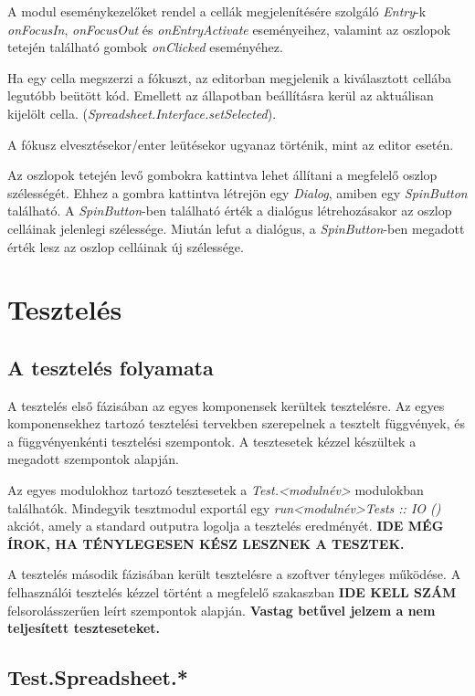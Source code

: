 A modul eseménykezelőket rendel a cellák megjelenítésére szolgáló \textit{Entry}-k \textit{onFocusIn}, \textit{onFocusOut} és \textit{onEntryActivate} eseményeihez, valamint az oszlopok tetején található gombok \textit{onClicked} eseményéhez.

Ha egy cella megszerzi a fókuszt, az editorban megjelenik a kiválasztott cellába legutóbb beütött kód. Emellett az állapotban beállításra kerül az aktuálisan kijelölt cella. (\textit{Spreadsheet.Interface.setSelected}).

A fókusz elvesztésekor/enter leütésekor ugyanaz történik, mint az editor esetén.

Az oszlopok tetején levő gombokra kattintva lehet állítani a megfelelő oszlop szélességét. Ehhez a gombra kattintva létrejön egy \textit{Dialog}, amiben egy \textit{SpinButton} található. A \textit{SpinButton}-ben található érték a dialógus létrehozásakor az oszlop celláinak jelenlegi szélessége. Miután lefut a dialógus, a \textit{SpinButton}-ben megadott érték lesz az oszlop celláinak új szélessége.

\section{Tesztelés}

\subsection{A tesztelés folyamata}

A tesztelés első fázisában az egyes komponensek kerültek tesztelésre. Az egyes komponensekhez tartozó tesztelési tervekben szerepelnek a tesztelt függvények, és a függvényenkénti tesztelési szempontok. A tesztesetek kézzel készültek a megadott szempontok alapján. 

Az egyes modulokhoz tartozó tesztesetek a \textit{Test.<modulnév>} modulokban találhatók. Mindegyik tesztmodul exportál egy \textit{run<modulnév>Tests :: IO ()} akciót, amely a standard outputra logolja a tesztelés eredményét. \textbf{IDE MÉG ÍROK, HA TÉNYLEGESEN KÉSZ LESZNEK A TESZTEK.}

A tesztelés második fázisában került tesztelésre a szoftver tényleges működése. A felhasználói tesztelés kézzel történt a megfelelő szakaszban \textbf{IDE KELL SZÁM} felsorolásszerűen leírt szempontok alapján. \textbf{Vastag betűvel jelzem a nem teljesített teszteseteket.}

\subsection{Test.Spreadsheet.*}

